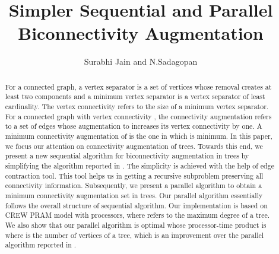 \documentclass[runningheads]{llncs}
\date{}
\title{Simpler Sequential and Parallel Biconnectivity Augmentation}
\author{Surabhi Jain and N.Sadagopan}
\institute{Department of Computer Science and Engineering,\\ Indian Institute of Information Technology, Design and Manufacturing, Kancheepuram, Chennai, India. \\
\email{\{surabhijain,sadagopan\}@iiitdm.ac.in}}
\begin{document}
\maketitle
\begin{abstract}
For a connected graph, a vertex separator is a set of vertices whose removal creates at least two components and a minimum vertex separator is a vertex separator of least cardinality.   The vertex connectivity refers to the size of a minimum vertex separator.  For a connected graph  with vertex connectivity , the connectivity augmentation refers to a set  of edges whose augmentation to  increases its vertex connectivity by one.  A minimum connectivity augmentation of  is the one in which  is minimum.  In this paper, we focus our attention on connectivity augmentation of trees. Towards this end, we present a new sequential algorithm for biconnectivity augmentation in trees by simplifying the algorithm reported in \cite{nsn}.  The simplicity is achieved with the help of edge contraction tool.  This tool helps us in getting a recursive subproblem preserving all connectivity information.  Subsequently, we present a parallel algorithm to obtain a minimum connectivity augmentation set in trees.  Our parallel algorithm essentially follows the overall structure of sequential algorithm.  Our implementation is based on CREW PRAM model with  processors, where  refers to the maximum degree of a tree.  We also show that our parallel algorithm is optimal whose processor-time product is  where  is the number of vertices of a tree, which is an improvement over the parallel algorithm reported in \cite{hsu}.  
\end{abstract}
\end{document}
